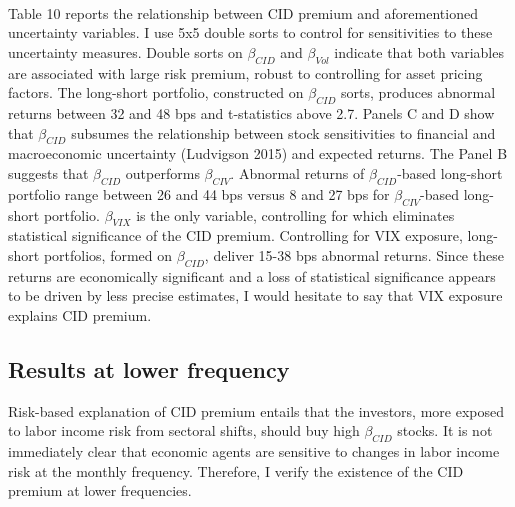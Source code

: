 \documentclass[12pt]{article}
\begin{document}
\paragraph{}
Table 10 reports the relationship between CID premium and aforementioned uncertainty variables. I use 5x5 double sorts to control for sensitivities to these uncertainty measures. Double sorts on $\beta_{CID}$ and $\beta_{Vol}$ indicate that both variables are associated with large risk premium, robust to controlling for asset pricing factors. The long-short portfolio, constructed on $\beta_{CID}$ sorts, produces abnormal returns between 32 and 48 bps and t-statistics above 2.7. Panels C and D show that $\beta_{CID}$ subsumes the relationship between stock sensitivities to financial and macroeconomic uncertainty (Ludvigson 2015) and expected returns. 
The Panel B suggests that $\beta_{CID}$ outperforms $\beta_{CIV}$. Abnormal returns of $\beta_{CID}$-based long-short portfolio range between 26 and 44 bps versus 8 and 27 bps for $\beta_{CIV}$-based long-short portfolio. $\beta_{VIX}$ is the only variable, controlling for which eliminates statistical significance of the CID premium. Controlling for VIX exposure, long-short portfolios, formed on $\beta_{CID}$, deliver 15-38 bps abnormal returns. Since these returns are economically significant and a loss of statistical significance appears to be driven by less precise estimates, I would hesitate to say that VIX exposure explains CID premium.

\subsection{Results at lower frequency}

Risk-based explanation of CID premium entails that the investors, more exposed to labor income risk from sectoral shifts, should buy high $\beta_{CID}$ stocks. It is not immediately clear that economic agents are sensitive to changes in labor income risk at the monthly frequency. Therefore, I verify the existence of the CID premium at lower frequencies.
\end{document}
